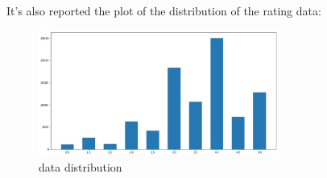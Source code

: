 \documentclass{article}
\begin{document}
It's also reported the plot of the distribution of the rating data:
\begin{figure}[ht]
      \begin{center}
            \includegraphics[width=0.7\textwidth]{images/rating distributions.png}
      \end{center}
      \caption{data distribution}
      \label{fig:data distribution}
\end{figure}

\newpage

\end{document}
